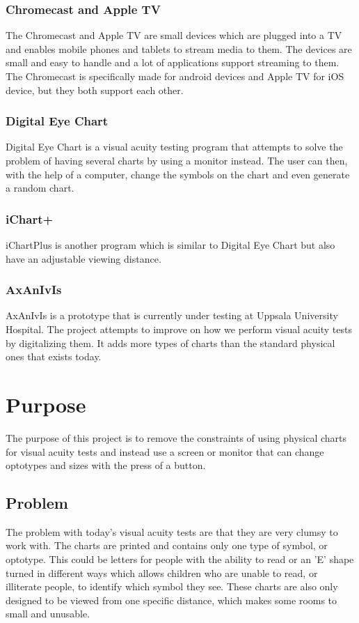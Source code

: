 \documentclass[12pt,a4paper,notitlepage]{report}
\begin{document}
\subsubsection{Chromecast and Apple TV}
The Chromecast \cite{chromecast} and Apple TV \cite{appletv} are small devices which are plugged into a TV and enables mobile phones and tablets to stream media to them. The devices are small and easy to handle and a lot of applications support streaming to them. The Chromecast is specifically made for android devices and Apple TV for iOS device, but they both support each other.


\subsubsection{Digital Eye Chart}
 Digital Eye Chart is a visual acuity testing program that attempts to solve the problem of having several charts by using a monitor instead. The user can then, with the help of a computer, change the symbols on the chart and even generate a random chart. \cite{digitaleyechart}

\subsubsection{iChart+}
iChartPlus is another program which is similar to Digital Eye Chart but also have an adjustable viewing distance. \cite{ichartplus}

\subsubsection{AxAnIvIs}
AxAnIvIs is a prototype that is currently under testing at Uppsala University Hospital. The project attempts to improve on how we perform visual acuity tests by digitalizing them. It adds more types of charts than the standard physical ones that exists today.

\section{Purpose}
The purpose of this project is to remove the constraints of using physical charts for visual acuity tests and instead use a screen or monitor that can change optotypes and sizes with the press of a button.

\subsection{Problem}
The problem with today's visual acuity tests are that they are very clumsy to work with. The charts are printed and contains only one type of symbol, or optotype. This could be letters for people with the ability to read or an 'E' shape turned in different ways which allows children who are unable to read, or illiterate people, to identify which symbol they see. These charts are also only designed to be viewed from one specific distance, which makes some rooms to small and unusable.
\end{document}
